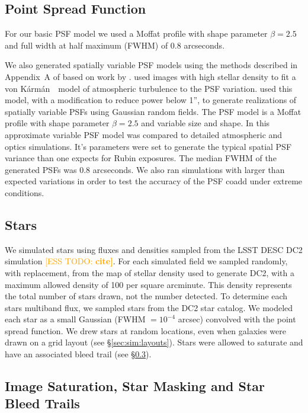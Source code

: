 \documentclass[iop, twocolappendix, appendixfloats, numberedappendix, apj]{hackemulateapj}
\newcommand{\esstodo}[1]{\textcolor{orange}{[ESS TODO: \bf #1]}}
\newcommand{\vonkarman}{{von K\'arm\'an}~}
\begin{document}
\subsection{Point Spread Function} \label{sec:sim:psfs}

For our basic PSF model we used a Moffat profile \citep{Moffat1969} with
shape parameter $\beta=2.5$ and full width at half maximum (FWHM) of 0.8 arcseconds.

We also generated spatially variable PSF models using the methods described in
Appendix~A of \citet{SheldonMdet2020} based on work by \citet{heymans2012}.
\citet{heymans2012} used images with high stellar density to fit a \vonkarman\
model of atmospheric turbulence to the PSF variation. \citet{SheldonMdet2020}
used this model, with a modification to reduce power below 1'', to generate
realizations of spatially variable PSFs using Gaussian random fields. The PSF
model is a Moffat \citep{Moffat1969} profile with shape parameter $\beta=2.5$
and variable size and shape. In \citet{SheldonMdet2020} this approximate
variable PSF model was compared to detailed atmospheric and optics simulations.
It's parameters were set to generate the typical spatial PSF variance than one
expects for Rubin exposures. The median FWHM of the generated PSFs was 0.8
arcseconds.  We also ran simulations with larger than expected variations in
order to test the accuracy of the PSF coadd under extreme conditions.

\subsection{Stars} \label{sec:sim:stars}

We simulated stars using fluxes and densities sampled from the LSST DESC DC2
simulation \esstodo{cite}.  For each simulated field we sampled randomly, with
replacement, from the map of stellar density used to generate DC2, with a
maximum allowed density of 100 per square arcminute.  This density represents
the total number of stars drawn, not the number detected.  To determine each
stars multiband flux, we sampled stars from the DC2 star catalog.  We modeled
each star as a small Gaussian (FWHM $= 10^{-4}$ arcsec) convolved with the
point spread function.  We drew stars at random locations, even when galaxies
were drawn on a grid layout (see \S \ref{sec:sim:layouts}).  Stars were allowed
to saturate and have an associated bleed trail (see
\S \ref{sec:sim:satbleeds}).

\subsection{Image Saturation, Star Masking and Star Bleed Trails} \label{sec:sim:satbleeds}
\end{document}
